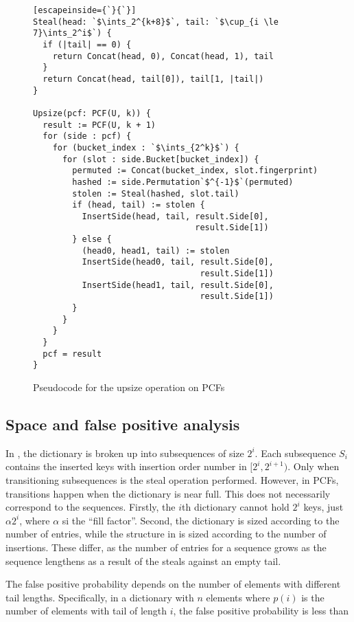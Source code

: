 \documentclass[letterpaper, 11pt]{article}
\newcommand{\ints}{\mathbb{Z}}
\begin{document}
\begin{figure}
\begin{lstlisting}[escapeinside={`}{`}]
Steal(head: `$\ints_2^{k+8}$`, tail: `$\cup_{i \le 7}\ints_2^i$`) {
  if (|tail| == 0) {
    return Concat(head, 0), Concat(head, 1), tail
  }
  return Concat(head, tail[0]), tail[1, |tail|)
}

Upsize(pcf: PCF(U, k)) {
  result := PCF(U, k + 1)
  for (side : pcf) {
    for (bucket_index : `$\ints_{2^k}$`) {
      for (slot : side.Bucket[bucket_index]) {
        permuted := Concat(bucket_index, slot.fingerprint)
        hashed := side.Permutation`$^{-1}$`(permuted)
        stolen := Steal(hashed, slot.tail)
        if (head, tail) := stolen {
          InsertSide(head, tail, result.Side[0],
                                 result.Side[1])
        } else {
          (head0, head1, tail) := stolen
          InsertSide(head0, tail, result.Side[0],
                                  result.Side[1])
          InsertSide(head1, tail, result.Side[0],
                                  result.Side[1])
        }
      }
    }
  }
  pcf = result
}
\end{lstlisting}
\caption{Pseudocode for the upsize operation on PCFs}
\end{figure}

\subsection{Space and false positive analysis}

In \cite{psw}, the dictionary is broken up into subsequences of size $2^i$.
Each subsequence $S_i$ contains the inserted keys with insertion order number in $[2^i, 2^{i+1})$.
Only when transitioning subsequences is the steal operation performed.
However, in PCFs, transitions happen when the dictionary is near full.
This does not necessarily correspond to the sequences.
Firstly, the $i$th dictionary cannot hold $2^i$ keys, just $\alpha 2^i$, where $\alpha$ si the ``fill factor''.
Second, the dictionary is sized according to the number of entries, while the structure in \cite{psw} is sized according to the number of insertions.
These differ, as the number of entries for a sequence grows as the sequence lengthens as a result of the steals against an empty tail.

The false positive probability depends on the number of elements with different tail lengths.
Specifically, in a dictionary with $n$ elements where $p(i)$ is the number of elements with tail of length $i$, the false positive probability is less than
\end{document}
